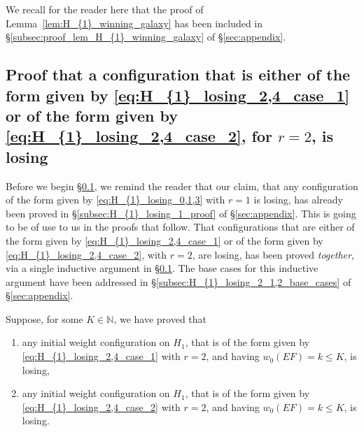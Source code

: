 \documentclass[11pt,reqno]{amsart}
\theoremstyle{definition}
\theoremstyle{definition}
\begin{document}
We recall for the reader here that the proof of Lemma~\ref{lem:H_{1}_winning_galaxy} has been included in \S\ref{subsec:proof_lem_H_{1}_winning_galaxy} of \S\ref{sec:appendix}.

\subsection{Proof that a configuration that is either of the form given by \eqref{eq:H_{1}_losing_2,4_case_1} or of the form given by \eqref{eq:H_{1}_losing_2,4_case_2}, for $r=2$, is losing}\label{subsec:proof_eq_H_{1}_losing_2_1,2}
Before we begin \S\ref{subsec:proof_eq_H_{1}_losing_2_1,2}, we remind the reader that our claim, that any configuration of the form given by \eqref{eq:H_{1}_losing_0,1,3} with $r=1$ is losing, has already been proved in \S\ref{subsec:H_{1}_losing_1_proof} of \S\ref{sec:appendix}. This is going to be of use to us in the proofs that follow. That configurations that are either of the form given by \eqref{eq:H_{1}_losing_2,4_case_1} or of the form given by \eqref{eq:H_{1}_losing_2,4_case_2}, with $r=2$, are losing, has been proved \emph{together}, via a single inductive argument in \S\ref{subsec:proof_eq_H_{1}_losing_2_1,2}. The base cases for this inductive argument have been addressed in \S\ref{subsec:H_{1}_losing_2_1,2_base_cases} of \S\ref{sec:appendix}.

Suppose, for some $K \in \mathbb{N}$, we have proved that 
\begin{enumerate}
\item any initial weight configuration on $H_{1}$, that is of the form given by \eqref{eq:H_{1}_losing_2,4_case_1} with $r=2$, and having $w_{0}(EF)=k \leqslant K$, is losing, 
\item any initial weight configuration on $H_{1}$, that is of the form given by \eqref{eq:H_{1}_losing_2,4_case_2} with $r=2$, and having $w_{0}(EF)=k \leqslant K$, is losing.
\end{enumerate}
\end{document}
